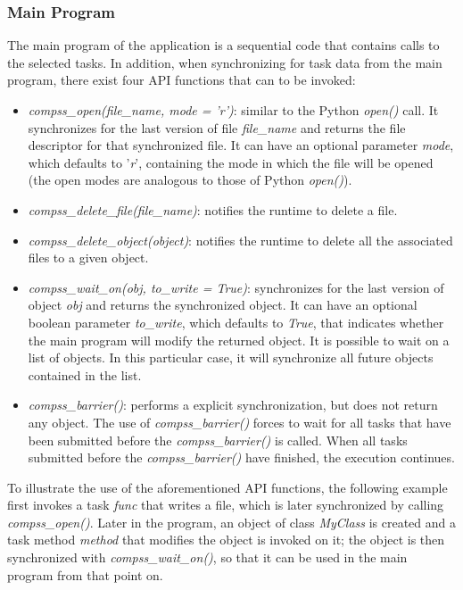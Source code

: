 \subsubsection{Main Program}
The main program of the application is a sequential code that contains calls to the selected tasks. 
In addition, when synchronizing for task data from the main program, 
there exist four API functions that can to be invoked:

\begin{itemize}
 \item {\it compss\_open(file\_name, mode = 'r')}: similar to the Python {\it open()} call. It synchronizes
       for the last version of file {\it file\_name} and returns the file descriptor for that synchronized
       file. It can have an optional parameter {\it mode}, which defaults to '{\it r}', containing the
       mode in which the file will be opened (the open modes are analogous to those of
       Python {\it open()}).
 \item {\it compss\_delete\_file(file\_name)}: notifies the runtime to delete a file.
 \item {\it compss\_delete\_object(object)}: notifies the runtime to delete all the associated files to
 a given object.
 \item {\it compss\_wait\_on(obj, to\_write = True)}: synchronizes for the last version of object {\it obj}
       and returns the synchronized object. It can have an optional boolean parameter
       {\it to\_write}, which defaults to {\it True}, that indicates whether the main program will modify the
       returned object.       
       It is possible to wait on a list of objects. In this particular case, it will synchronize all future objects 
       contained in the list.
 \item {\it compss\_barrier()}: performs a explicit synchronization, but does not return any object. The use of {\it compss\_barrier()}
       forces to wait for all tasks that have been submitted before the {\it compss\_barrier()} is called.
       When all tasks submitted before the {\it compss\_barrier()} have finished, the execution continues.
\end{itemize}

To illustrate the use of the aforementioned API functions, the following example first invokes a task 
{\it func} that writes a file, which is later synchronized by calling {\it compss\_open()}. 
Later in the program, an object of class {\it MyClass} is created and a task method {\it method} 
that modifies the object is invoked on it; the object is then synchronized with {\it compss\_wait\_on()}, 
so that it can be used in the main program from that point on.

